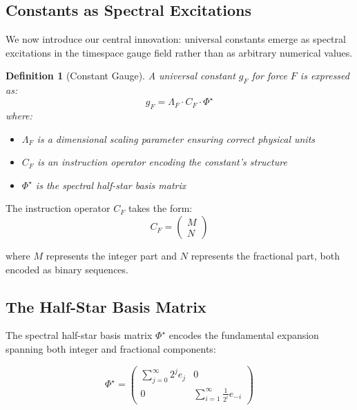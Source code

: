 \documentclass{article}
\newtheorem{definition}{Definition}
\begin{document}
\subsection{Constants as Spectral Excitations}

We now introduce our central innovation: universal constants emerge as spectral excitations in the timespace gauge field rather than as arbitrary numerical values.

\begin{definition}[Constant Gauge]
A universal constant $g_F$ for force $F$ is expressed as:
\begin{equation}
g_F = \Lambda_F \cdot C_F \cdot \Phi^\star
\end{equation}
where:
\begin{itemize}
\item $\Lambda_F$ is a dimensional scaling parameter ensuring correct physical units
\item $C_F$ is an instruction operator encoding the constant's structure
\item $\Phi^\star$ is the spectral half-star basis matrix
\end{itemize}
\end{definition}

The instruction operator $C_F$ takes the form:
\begin{equation}
C_F = \begin{pmatrix} M \\ N \end{pmatrix}
\end{equation}

where $M$ represents the integer part and $N$ represents the fractional part, both encoded as binary sequences.

\subsection{The Half-Star Basis Matrix}

The spectral half-star basis matrix $\Phi^\star$ encodes the fundamental expansion spanning both integer and fractional components:

\begin{equation}
\Phi^\star = \begin{pmatrix}
\sum_{j=0}^{\infty} 2^j e_j & 0 \\
0 & \sum_{i=1}^{\infty} \frac{1}{2^i} e_{-i}
\end{pmatrix}
\end{equation}
\end{document}
